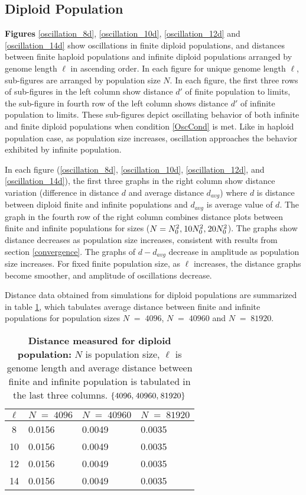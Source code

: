 \subsection{Diploid Population}

\textbf{ Figures} \ref{oscillation_8d}, \ref{oscillation_10d}, \ref{oscillation_12d} 
and \ref{oscillation_14d} show oscillations in finite diploid populations, and distances 
between finite haploid populations and infinite diploid populations arranged by genome length $\ell$ in ascending order. 
In each figure for unique genome length $\ell$, sub-figures 
are arranged by population size $N$. In each figure, the first three rows of sub-figures in the left column show distance $d'$ of finite population 
to limits, the sub-figure in fourth row of the left column shows distance $d'$ of infinite population to limits. These sub-figures depict 
oscillating behavior of both infinite and finite diploid populations when condition \ref{OscCond} is met. 
Like in haploid population case, as population size increases, oscillation approaches the behavior exhibited by infinite population. 

In each figure (\ref{oscillation_8d}, \ref{oscillation_10d}, \ref{oscillation_12d}, 
and \ref{oscillation_14d}), the first three graphs in the right column show 
distance variation (difference in distance $d$ and average distance $d_{avg}$)  
where $d$ is distance between diploid finite and infinite populations and $d_{avg}$ is average value of $d$. 
The graph in the fourth row of the right column combines distance plots between finite and infinite populations for sizes 
($N = N_0^2, \hspace{0.01in}10N_0^2, \hspace{0.01in}20N_0^2$). The graphs show distance decreases 
as population size increases, consistent with results from section \ref{convergence}. 
The graphs of $d-d_{avg}$ decrease in amplitude as population size increases. 
For fixed finite population size, as $\ell$ increases, the distance graphs become smoother, and amplitude of oscillations decrease.

Distance data obtained from simulations for diploid populations are summarized in table \ref{tableDistanceOscDip}, 
which tabulates average distance between finite and infinite populations 
for population sizes $N \;=\; 4096 $, $N \;=\; 40960 $ and $N \;=\; 81920 $.
\begin{table}[ht]
\caption{\textbf{Distance measured for diploid population:} $N$ is population size, $\ell$ is genome length 
and average distance between finite and infinite population is tabulated in the last three columns. $\{4096, \hspace{0.01in} 40960, \hspace{0.01in} 81920\}$ }
\centering
\begin{tabularx}{0.75\textwidth}{ c *{3}{X}}
\toprule
$\ell$ & $N \;=\; 4096 $ & $N \;=\; 40960 $ & $N \;=\; 81920 $\\
\midrule
8 & 0.0156 & 0.0049 & 0.0035 \\
10 & 0.0156 & 0.0049 & 0.0035 \\
12 & 0.0156 & 0.0049 & 0.0035 \\
14 & 0.0156 & 0.0049 & 0.0035 \\
\bottomrule

\end{tabularx}
\label{tableDistanceOscDip}
\end{table}

